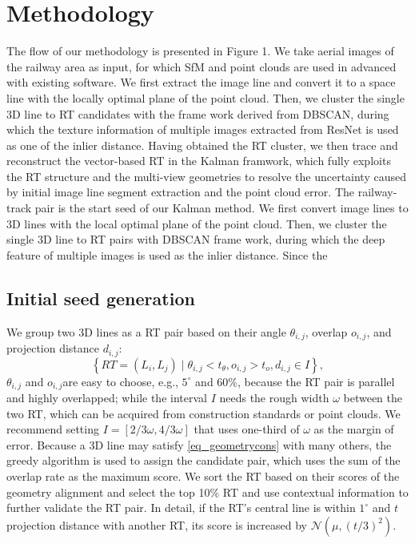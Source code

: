 \section{Methodology}

The flow of our methodology is presented in Figure 1.
We take aerial images of the railway area as input,
for which SfM and point clouds are used in advanced with existing software.
We first extract the image line and convert it to a space line with the locally optimal plane of the point cloud.
Then,
we cluster the single 3D line to RT candidates with the frame work derived from DBSCAN,  
during which the texture information of multiple images extracted from ResNet is used as one of the inlier distance.
Having obtained the RT cluster, 
we then trace and reconstruct the vector-based RT in the Kalman framwork,
which fully exploits the RT structure and the multi-view geometries to resolve the uncertainty caused by initial image line segment extraction and the point cloud error.
The railway-track pair is the start seed of our Kalman method.
We first convert image lines to 3D lines with the local optimal plane of the point cloud.
Then,
we cluster the single 3D line to RT pairs with DBSCAN frame work,  
during which the deep feature of multiple images is used as the inlier distance.
Since the 

\subsection{Initial seed generation}

We group two 3D lines as a RT pair based on their angle $\theta_{i,j}$,
overlap $o_{i,j}$,
and projection distance $d_{i,j}$:
\begin{equation}
   \left\{ RT= \left(L_i, L_j\right) \mid \theta_{i,j} < t_\theta, o_{i,j} > t_o, d_{i,j} \in I  \right\},
    \label{eq_geometrycons}
\end{equation}
$\theta_{i,j}$ and $o_{i,j}$are easy to choose,
e.g.,
$5^\circ$ and 60\%,
because the RT pair is parallel and highly overlapped;
while the interval $I$ needs the rough width $\omega$ between the two RT,
which can be acquired from construction standards or point clouds.
We recommend setting $I=\left[2/3\omega,4/3\omega\right]$ that uses one-third of $\omega$ as the margin of error.
Because a 3D line may satisfy \cref{eq_geometrycons} with many others,
the greedy algorithm is used to assign the candidate pair,
which uses the sum of the overlap rate as the maximum score.
We sort the RT based on their scores of the geometry alignment and select the top 10\% RT and use contextual information to further validate the RT pair.
In detail,
if the RT's central line is within $1^\circ$ and $t$ projection distance with another RT,
its score is increased by $\mathcal{N}\left(\mu, \left(t/3\right)^2\right)$.

